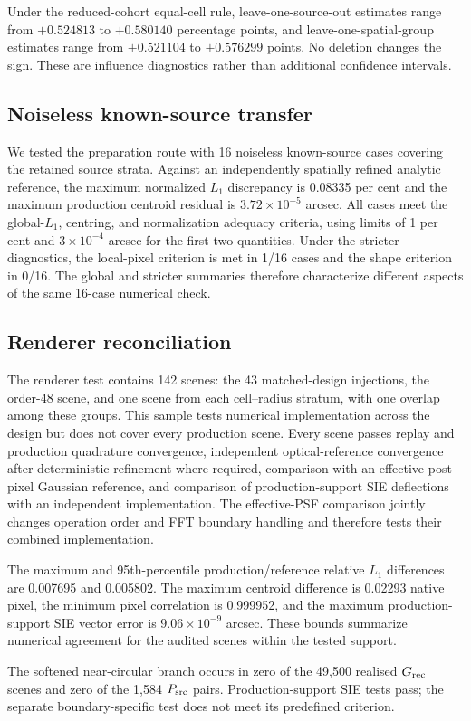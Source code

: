 Under the reduced-cohort equal-cell rule, leave-one-source-out estimates range
from \(+0.524813\) to \(+0.580140\) percentage points, and
leave-one-spatial-group estimates range from \(+0.521104\) to \(+0.576299\)
points. No deletion changes the
sign. These are influence diagnostics rather than additional confidence
intervals.

\subsection{Noiseless known-source transfer}
\label{app:source_transfer_followup}

We tested the preparation route with 16 noiseless known-source cases covering
the retained source strata. Against an independently spatially refined
analytic reference, the maximum normalized \(L_1\) discrepancy is 0.08335 per
cent and the maximum production centroid residual is
\(3.72\times10^{-5}\) arcsec. All cases meet the global-\(L_1\),
centring, and normalization adequacy criteria, using limits of 1 per cent and
\(3\times10^{-4}\) arcsec for the first two quantities. Under the stricter
diagnostics, the local-pixel criterion is met in 1/16 cases and the shape
criterion in 0/16. The global and stricter summaries therefore characterize
different aspects of the same 16-case numerical check.

\subsection{Renderer reconciliation}
\label{app:renderer_reconciliation}

The renderer test contains 142 scenes: the 43 matched-design injections, the
order-48 scene, and one scene from each cell--radius stratum, with one overlap
among these groups. This sample tests numerical implementation across the
design but does not cover every production scene.
Every scene passes replay and production quadrature convergence,
independent optical-reference convergence after deterministic refinement
where required, comparison with an effective post-pixel Gaussian reference,
and comparison of production-support SIE deflections with an independent
implementation.
The effective-PSF comparison jointly changes operation order and FFT boundary
handling and therefore tests their combined implementation.

The maximum and 95th-percentile production/reference relative \(L_1\)
differences are 0.007695 and 0.005802. The maximum centroid difference is
0.02293 native pixel, the minimum pixel correlation is 0.999952, and the
maximum production-support SIE vector error is
\(9.06\times10^{-9}\) arcsec. These bounds summarize numerical agreement for
the audited scenes within the tested support.

The softened near-circular branch occurs in zero of the 49,500
realised \(G_{\rm rec}\) scenes and zero of the 1,584 \(P_{\rm src}\) pairs.
Production-support SIE tests pass; the separate boundary-specific test does
not meet its predefined criterion.

\vspace{-2pt}
\FloatBarrier
